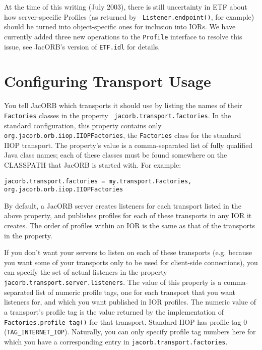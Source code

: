 At the time of this writing (July 2003), there is still uncertainty in
 ETF about how server-specific Profiles (as returned by {\tt
 Listener.endpoint()}, for example) should be turned into
 object-specific ones for inclusion into IORs.  We have currently
 added three new operations to the {\tt Profile} interface to resolve
 this issue, see JacORB's version of {\tt ETF.idl} for details.

\section{Configuring Transport Usage}

You tell JacORB which transports it should use by listing the names of
 their {\tt Factories} classes in the property {\tt
 jacorb.transport.factories}.  In the standard configuration, this
 property contains only {\tt org.jacorb.orb.iiop.IIOPFactories}, the
 {\tt Factories} class for the standard IIOP transport.  The
 property's value is a comma-separated list of fully qualified Java
 class names; each of these classes must be found somewhere on the
 CLASSPATH that JacORB is started with.  For example:

\begin{scriptsize}
\begin{verbatim}
jacorb.transport.factories = my.transport.Factories, org.jacorb.orb.iiop.IIOPFactories
\end{verbatim}
\end{scriptsize}

By default, a JacORB server creates listeners for each transport
listed in the above property, and publishes profiles for each of these
transports in any IOR it creates.  The order of profiles within an IOR
is the same as that of the transports in the property.

If you don't want your servers to listen on each of these transports
 (e.g. because you want some of your transports only to be used for
 client-side connections), you can specify the set of actual listeners
 in the property {\tt jacorb.transport.server.listeners}.  The value
 of this property is a comma-separated list of numeric profile tags,
 one for each transport that you want listeners for, and which you
 want published in IOR profiles.  The numeric value of a transport's
 profile tag is the value returned by the implementation of {\tt
 Factories.profile\_tag()} for that transport.  Standard IIOP has
 profile tag 0 ({\tt TAG\_INTERNET\_IOP}).  Naturally, you can only
 specify profile tag numbers here for which you have a corresponding
 entry in {\tt jacorb.transport.factories}.

